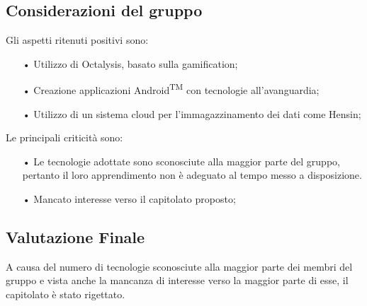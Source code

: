 \subsection{Considerazioni del gruppo}
Gli aspetti ritenuti positivi sono: 
\begin{itemize}
\item[•] Utilizzo di Octalysis, basato sulla {gamification};
\item[•] Creazione applicazioni Android\textsuperscript{TM} con tecnologie all'avanguardia;
\item[•] Utilizzo di un sistema cloud per l'immagazzinamento dei dati come Hensin;
\end{itemize}

Le principali criticità sono:
\begin{itemize}
\item[•] Le tecnologie adottate sono sconosciute alla maggior parte del gruppo, pertanto il loro apprendimento non è adeguato al tempo messo a disposizione. 
\item[•] Mancato interesse verso il capitolato proposto;
\end{itemize}

\subsection{Valutazione Finale}
A causa del numero di tecnologie sconosciute alla maggior parte dei membri del gruppo e vista anche la mancanza di interesse verso la maggior parte di esse, il capitolato è stato rigettato.

